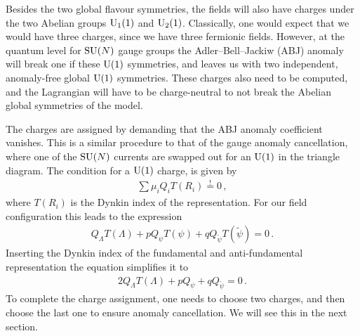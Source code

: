 Besides the two global flavour symmetries, the fields will also have charges under the two Abelian groups $\mathrm{U}_1(1)$ and $\mathrm{U}_2(1)$. Classically, one would expect that we would have three charges, since we have three fermionic fields. However, at the quantum level for $\mathrm{SU}(N)$ gauge groups the Adler--Bell--Jackiw (ABJ) anomaly \cite{Adler:1969gk,Bell:1969ts} will break one if these $\mathrm{U}(1)$ symmetries, and leaves us with two independent, anomaly-free global $\mathrm{U}(1)$ symmetries. These charges also need to be computed, and the Lagrangian will have to be charge-neutral to not break the Abelian global symmetries of the model. 

The charges are assigned by demanding that the ABJ anomaly coefficient vanishes. This is a similar procedure to that of the gauge anomaly cancellation, where one of the $\mathrm{SU}(N)$ currents are swapped out for an $\mathrm{U}(1)$ in the triangle diagram. The condition for a $\mathrm{U}(1)$ charge, is given by 
\begin{align}
    \sum \mu_i Q_i T(R_i)\overset{!}{=}0\,,
\end{align}
where $T(R_i)$ is the Dynkin index of the representation. For our field configuration this leads to the expression
\begin{align}
     Q_\Lambda T(\Lambda) + p Q_\psi T(\psi) + q Q_{\tilde{\psi}} T(\tilde{\psi}) = 0\,.
\end{align}
Inserting the Dynkin index of the fundamental and anti-fundamental representation the equation simplifies it to 
\begin{align}
     2Q_\Lambda T(\Lambda) + p Q_\psi + q Q_{\tilde{\psi}} = 0\,.\label{eq:chargeeq}
\end{align}
To complete the charge assignment, one needs to choose two charges, and then choose the last one to ensure anomaly cancellation. We will see this in the next section. 

